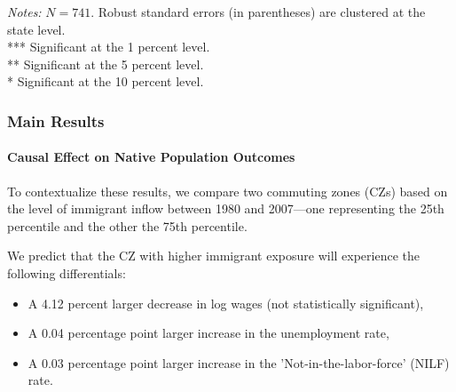 \begin{frame}
\begin{table}[ht]
{\begin{tabular}{rcccccccccccc}
            \bottomrule
            \end{tabular}
        }
        \vspace{0.2cm}
        
        \begin{minipage}{\linewidth}
            \tiny
            \textit{Notes:} $N = 741$. Robust standard errors (in parentheses) are clustered at the state level.\\
            *** Significant at the 1 percent level. \\
            ** Significant at the 5 percent level. \\
            * Significant at the 10 percent level.
        \end{minipage}
    \end{table}
\end{frame}

\begin{frame}
    \frametitle{Main Results}
    \framesubtitle{Causal Effect on Native Population Outcomes}

    To contextualize these results, we compare two commuting zones (CZs) based on the level of immigrant inflow between 1980 and 2007—one representing the 25th percentile and the other the 75th percentile.

We predict that the CZ with higher immigrant exposure will experience the following differentials:
\begin{itemize}
    \item A 4.12 percent larger decrease in log wages (not statistically significant),
    \item A 0.04 percentage point larger increase in the unemployment rate,
    \item A 0.03 percentage point larger increase in the 'Not-in-the-labor-force' (NILF) rate.
\end{itemize}

\end{frame}